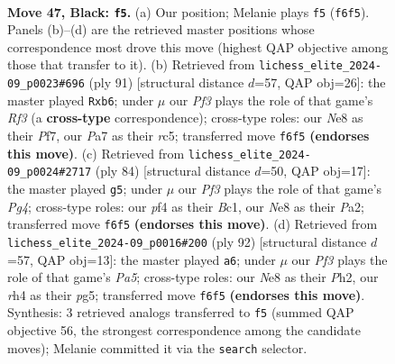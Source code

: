 \documentclass[11pt]{article}
\begin{document}
\clearpage

\begin{figure}[p]\centering
\begin{subfigure}{0.46\textwidth}\centering
\resizebox{\linewidth}{!}{%
\newchessgame
\chessboard[
  setfen={4n3/p1p5/2k2p2/8/r4P1R/8/2KB3P/r4BR1 b - - 4 47},
  showmover=false,
  pgfstyle=straightmove, color=movearrow, markmove={f6-f5}
]}
\caption{}
\end{subfigure}\hfill
\begin{subfigure}{0.46\textwidth}\centering
\resizebox{\linewidth}{!}{%
\newchessgame
\chessboard[
  setfen={4r3/5pk1/1P3r2/2R5/6P1/4p1B1/P3R1K1/8 b - - 0 46},
  showmover=false,
  pgfstyle=straightmove, color=movearrow, markmove={f6-b6}
]}
\caption{}
\end{subfigure}
\\[4pt]
\begin{subfigure}{0.46\textwidth}\centering
\resizebox{\linewidth}{!}{%
\newchessgame
\chessboard[
  setfen={8/8/3kr3/pp2p3/3bR1P1/3r1PK1/P3R3/2B5 w - - 2 43},
  showmover=false,
  pgfstyle=straightmove, color=movearrow, markmove={g4-g5}
]}
\caption{}
\end{subfigure}\hfill
\begin{subfigure}{0.46\textwidth}\centering
\resizebox{\linewidth}{!}{%
\newchessgame
\chessboard[
  setfen={3r4/1R3pk1/8/P1PpP1pp/3Kb3/8/1R5P/8 w - - 1 47},
  showmover=false,
  pgfstyle=straightmove, color=movearrow, markmove={a5-a6}
]}
\caption{}
\end{subfigure}
\caption{\textbf{Move 47, Black: \texttt{f5}.} (a) Our position; Melanie plays \texttt{f5} (\texttt{f6f5}). Panels (b)--(d) are the retrieved master positions whose correspondence most drove this move (highest QAP objective among those that transfer to it). (b) Retrieved from \texttt{lichess\_elite\_2024-09\_p0023\#696} (ply 91) [structural distance $d$=57, QAP obj=26]: the master played \texttt{Rxb6}; under $\mu$ our \emph{Pf3} plays the role of that game's \emph{Rf3} (a \textbf{cross-type} correspondence); cross-type roles: our \emph{N}e8 as their \emph{P}f7, our \emph{P}a7 as their \emph{r}c5; transferred move \texttt{f6f5} \textbf{(endorses this move)}. (c) Retrieved from \texttt{lichess\_elite\_2024-09\_p0024\#2717} (ply 84) [structural distance $d$=50, QAP obj=17]: the master played \texttt{g5}; under $\mu$ our \emph{Pf3} plays the role of that game's \emph{Pg4}; cross-type roles: our \emph{p}f4 as their \emph{B}c1, our \emph{N}e8 as their \emph{P}a2; transferred move \texttt{f6f5} \textbf{(endorses this move)}. (d) Retrieved from \texttt{lichess\_elite\_2024-09\_p0016\#200} (ply 92) [structural distance $d$=57, QAP obj=13]: the master played \texttt{a6}; under $\mu$ our \emph{Pf3} plays the role of that game's \emph{Pa5}; cross-type roles: our \emph{N}e8 as their \emph{P}h2, our \emph{r}h4 as their \emph{p}g5; transferred move \texttt{f6f5} \textbf{(endorses this move)}. Synthesis: 3 retrieved analogs transferred to \texttt{f5} (summed QAP objective 56, the strongest correspondence among the candidate moves); Melanie committed it via the \texttt{search} selector.}
\label{fig:thought-m93}
\end{figure}
\end{document}

